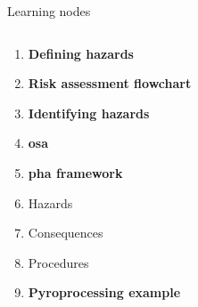 \documentclass[aspectratio=1610,pdftex,dvipsnames,compress,xcolor={dvipsnames}]{beamer}
\newcommand{\acs}{\acrshort} %
\begin{document}
\begin{frame}{Learning nodes}
    \begin{columns}[t]

        \begin{column}{0.50\textwidth}
            \begin{enumerate}[series=outerlist,topsep=0pt,itemsep=1pt,leftmargin=*,label=(\arabic*)]
                \item[]\textbf{Defining hazards}
                    \vspace{0.10in}
                \item[]\textbf{Risk assessment flowchart}
                    \vspace{0.10in}
                \item[]\textbf{Identifying hazards}
                    \vspace{0.10in}
                \item[]\textbf{\acs{osa}}
                    \vspace{0.10in}
                \item[]\textbf{\acs{pha} framework}
                \item[]Hazards
                \item[]Consequences
                \item[]Procedures
                    \vspace{0.10in}
                \item[]\textbf{Pyroprocessing example}
            \end{enumerate}
        \end{column}


\end{columns}
\end{frame}
\end{document}
